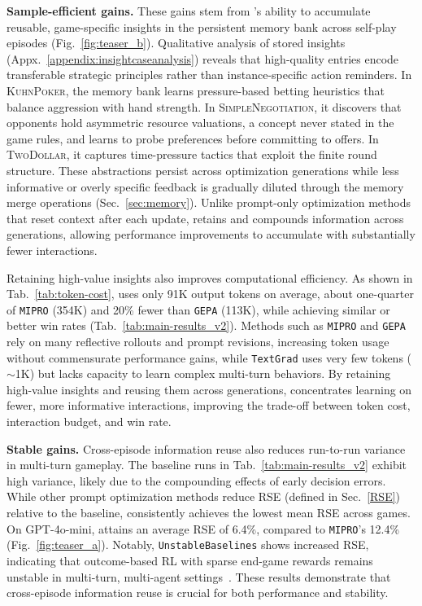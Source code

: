 

\textbf{Sample-efficient gains.}
These gains stem from \NAME{}'s ability to accumulate reusable, game-specific insights in the persistent memory bank across self-play episodes (Fig.~\ref{fig:teaser_b}). Qualitative analysis of stored insights (Appx.~\ref{appendix:insightcaseanalysis}) reveals that high-quality entries encode transferable strategic principles rather than instance-specific action reminders. In \textsc{KuhnPoker}, the memory bank learns pressure-based betting heuristics that balance aggression with hand strength. In \textsc{SimpleNegotiation}, it discovers that opponents hold asymmetric resource valuations, a concept never stated in the game rules, and learns to probe preferences before committing to offers. In \textsc{TwoDollar}, it captures time-pressure tactics that exploit the finite round structure. These abstractions persist across optimization generations while less informative or overly specific feedback is gradually diluted through the memory merge operations (Sec.~\ref{sec:memory}). Unlike prompt-only optimization methods that reset context after each update, \NAME{} retains and compounds information across generations, allowing performance improvements to accumulate with substantially fewer interactions.

Retaining high-value insights also improves computational efficiency. As shown in Tab.~\ref{tab:token-cost}, \NAME{} uses only 91K output tokens on average, about one-quarter of \texttt{MIPRO} (354K) and 20\% fewer than \texttt{GEPA} (113K), while achieving similar or better win rates (Tab.~\ref{tab:main-results_v2}). Methods such as \texttt{MIPRO} and \texttt{GEPA} rely on many reflective rollouts and prompt revisions, increasing token usage without commensurate performance gains, while \texttt{TextGrad} uses very few tokens ($\sim$1K) but lacks capacity to learn complex multi-turn behaviors. By retaining high-value insights and reusing them across generations, \NAME{} concentrates learning on fewer, more informative interactions, improving the trade-off between token cost, interaction budget, and win rate.


\textbf{Stable gains.}
Cross-episode information reuse also reduces run-to-run variance in multi-turn gameplay. The baseline runs in Tab.~\ref{tab:main-results_v2} exhibit high variance, likely due to the compounding effects of early decision errors. While other prompt optimization methods reduce RSE (defined in Sec.~\ref{RSE}) relative to the baseline, \NAME{} consistently achieves the lowest mean RSE across games. On GPT-4o-mini, \NAME{} attains an average RSE of 6.4\%, compared to \texttt{MIPRO}'s 12.4\% (Fig.~\ref{fig:teaser_a}). Notably, \texttt{UnstableBaselines} shows increased RSE, indicating that outcome-based RL with sparse end-game rewards remains unstable in multi-turn, multi-agent settings~\citep{wang2025ragen}. These results demonstrate that cross-episode information reuse is crucial for both performance and stability.




